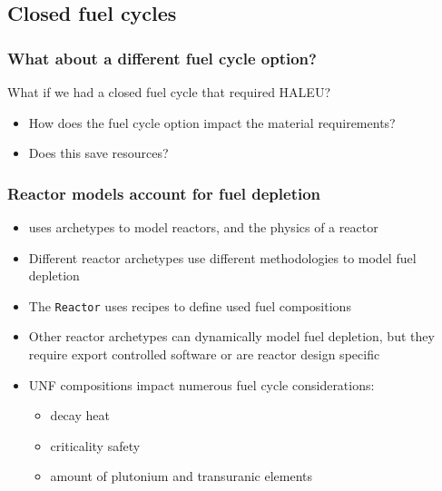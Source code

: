 \subsection{Closed fuel cycles}
\begin{frame}
    \frametitle{What about a different fuel cycle option?}
    What if we had a closed fuel cycle that required \gls{HALEU}?
    \begin{itemize}
        \item How does the fuel cycle option impact the material requirements?
        \item Does this save resources?
    \end{itemize}

\end{frame}

\begin{frame}
    \frametitle{Reactor models account for fuel depletion}
    \begin{itemize}
    \item \Cyclus uses archetypes to model reactors, and the physics 
        of a reactor
    \item Different reactor archetypes use different methodologies 
        to model fuel depletion
   \item<2-> The \Cycamore \texttt{Reactor} uses recipes to define used fuel compositions
   \item<2-> Other \Cyclus reactor archetypes can dynamically model 
         fuel depletion, but they require export controlled software 
         or are reactor design specific
    \item<3-> \Gls{UNF} compositions impact numerous fuel cycle considerations:
    \begin{itemize}
        \item<3-> decay heat
        \item<3-> criticality safety
        \item<3-> amount of plutonium and transuranic elements
    \end{itemize}


\end{itemize}
\end{frame}

